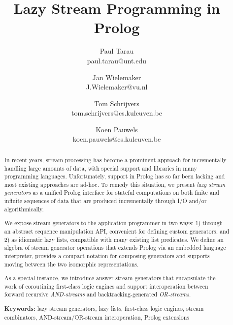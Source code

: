 \documentclass{new_tlp}
\begin{document}

\title{Lazy Stream Programming in Prolog}

\author[Paul Tarau, Jan Wielemaker, Tom Schrijvers and Koen Pauwels]
          {    Paul Tarau\\
          { paul.tarau@unt.edu}
          \and
          Jan Wielemaker\\
          { J.Wielemaker@vu.nl}
          \and
          Tom Schrijvers\\
          { tom.schrijvers@cs.kuleuven.be}
          \and
          Koen Pauwels\\
          { koen.pauwels@cs.kuleuven.be}
}          

\maketitle



\begin{abstract}
In recent years, stream processing has become a prominent approach for incrementally handling large amounts of data, with special support and libraries in many programming languages. Unfortunately, support in Prolog has so far been lacking and most existing approaches are ad-hoc. To remedy this situation, we present {\em lazy stream generators} as a unified Prolog interface for stateful computations on both finite and infinite sequences of data that are produced incrementally through I/O and/or algorithmically.

We expose stream generators to the application programmer in two ways: 1) through an abstract sequence manipulation API, convenient for defining custom generators, and 2) as idiomatic lazy lists, compatible with many existing list predicates.  We define an algebra of stream generator operations that extends Prolog via an embedded language interpreter, provides a compact notation for composing generators and supports moving between the two isomorphic representations.

As a special instance, we introduce answer stream generators that encapsulate the work of coroutining first-class logic engines and support interoperation between forward recursive {\em AND-streams} and backtracking-generated {\em OR-streams}. 

{\bf Keywords:}
lazy stream generators,
lazy lists,
first-class logic engines,
stream combinators,
AND-stream/OR-stream interoperation,
Prolog extensions

\end{abstract}
\end{document}
